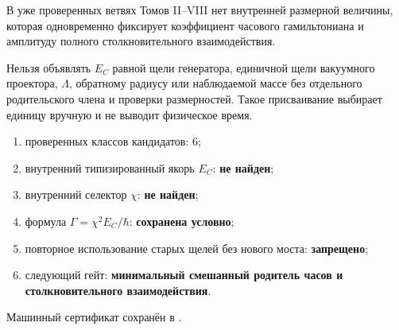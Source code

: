 \begin{theorem}
В уже проверенных ветвях Томов II--VIII нет внутренней размерной величины,
которая одновременно фиксирует коэффициент часового гамильтониана и
амплитуду полного столкновительного взаимодействия.
\end{theorem}

\begin{nogocriterion}
Нельзя объявлять $E_C$ равной щели генератора, единичной щели вакуумного
проектора, $\Lambda$, обратному радиусу или наблюдаемой массе без отдельного
родительского члена и проверки размерностей. Такое присваивание выбирает
единицу вручную и не выводит физическое время.
\end{nogocriterion}

\begin{protocol}
\begin{enumerate}
 \item проверенных классов кандидатов: \textbf{$6$};
 \item внутренний типизированный якорь $E_C$: \textbf{не найден};
 \item внутренний селектор $\chi$: \textbf{не найден};
 \item формула $\Gamma=\chi^2E_C/\hbar$: \textbf{сохранена условно};
 \item повторное использование старых щелей без нового моста:
 \textbf{запрещено};
 \item следующий гейт: \textbf{минимальный смешанный родитель часов и
 столкновительного взаимодействия}.
\end{enumerate}
\end{protocol}

Машинный сертификат сохранён в
.
